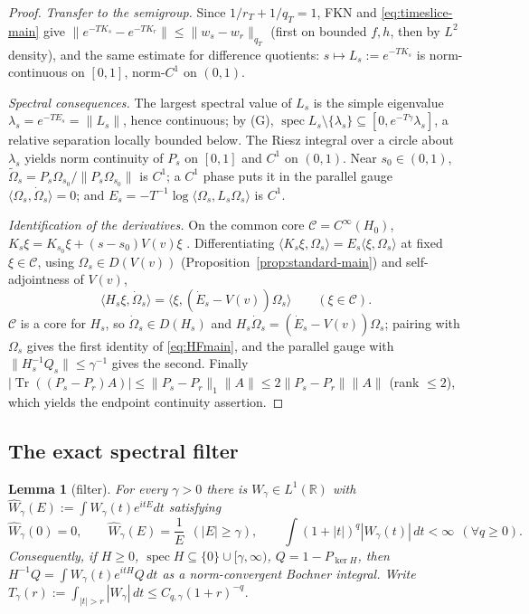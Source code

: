 \documentclass[11pt,a4paper]{article}
\theoremstyle{plain}
\newtheorem{lemma}[theorem]{Lemma}
\theoremstyle{definition}
\newcommand{\R}{\mathbb{R}}
\newcommand{\Om}{\Omega}
\newcommand{\ip}[2]{\langle #1,#2\rangle}
\DeclareMathOperator{\spec}{spec}
\begin{document}
\begin{proof}
\emph{Transfer to the semigroup.} Since $1/r_T+1/q_T=1$, FKN and
\eqref{eq:timeslice-main} give
$\|e^{-TK_s}-e^{-TK_r}\|\le\|w_s-w_r\|_{q_T}$ (first on bounded $f,h$, then by $L^2$ density),
and the same estimate for difference quotients: $s\mapsto L_s:=e^{-TK_s}$ is norm-continuous on
$[0,1]$, norm-$C^1$ on $(0,1)$.

\emph{Spectral consequences.} The largest spectral value of $L_s$ is the simple eigenvalue
$\lambda_s=e^{-TE_s}=\|L_s\|$, hence continuous; by (G),
$\spec L_s\setminus\{\lambda_s\}\subseteq[0,e^{-T\gamma}\lambda_s]$, a relative separation
locally bounded below. The Riesz integral over a circle about $\lambda_s$ yields norm continuity
of $P_s$ on $[0,1]$ and $C^1$ on $(0,1)$. Near $s_0\in(0,1)$,
$\widetilde\Om_s=P_s\Om_{s_0}/\|P_s\Om_{s_0}\|$ is $C^1$; a $C^1$ phase puts it in the parallel
gauge $\ip{\Om_s}{\dot\Om_s}=0$; and $E_s=-T^{-1}\log\ip{\Om_s}{L_s\Om_s}$ is $C^1$.

\emph{Identification of the derivatives.} On the common core $\mathscr C=C^\infty(H_0)$,
$K_s\xi=K_{s_0}\xi+(s-s_0)V(v)\xi$ \cite[Thm.~V.12(a)]{SimonBook}. Differentiating
$\ip{K_s\xi}{\Om_s}=E_s\ip{\xi}{\Om_s}$ at fixed $\xi\in\mathscr C$, using
$\Om_s\in D(V(v))$ (Proposition~\ref{prop:standard-main}) and self-adjointness of $V(v)$,
\[
  \ip{H_s\xi}{\dot\Om_s}=\ip{\xi}{(\dot E_s-V(v))\Om_s}\qquad(\xi\in\mathscr C).
\]
$\mathscr C$ is a core for $H_s$, so $\dot\Om_s\in D(H_s)$ and
$H_s\dot\Om_s=(\dot E_s-V(v))\Om_s$; pairing with $\Om_s$ gives the first identity of
\eqref{eq:HFmain}, and the parallel gauge with $\|H_s^{-1}Q_s\|\le\gamma^{-1}$ gives the second.
Finally $|\operatorname{Tr}((P_s-P_r)A)|\le\|P_s-P_r\|_1\|A\|\le2\|P_s-P_r\|\|A\|$ (rank
$\le2$), which yields the endpoint continuity assertion.
\end{proof}

\subsection{The exact spectral filter}

\begin{lemma}[filter]\label{prop:filter-main}
For every $\gamma>0$ there is $W_\gamma\in L^1(\R)$ with
$\widehat W_\gamma(E):=\int W_\gamma(t)e^{itE}dt$ satisfying
\[
  \widehat W_\gamma(0)=0,\qquad \widehat W_\gamma(E)=\frac1E\ \ (|E|\ge\gamma),\qquad
  \int(1+|t|)^q|W_\gamma(t)|\,dt<\infty\ \ (\forall q\ge0).
\]
Consequently, if $H\ge0$, $\spec H\subseteq\{0\}\cup[\gamma,\infty)$, $Q=1-P_{\ker H}$, then
$H^{-1}Q=\int W_\gamma(t)e^{itH}Q\,dt$ as a norm-convergent Bochner integral. Write
$T_\gamma(r):=\int_{|t|>r}|W_\gamma|\,dt\le C_{q,\gamma}(1+r)^{-q}$.
\end{lemma}
\end{document}
